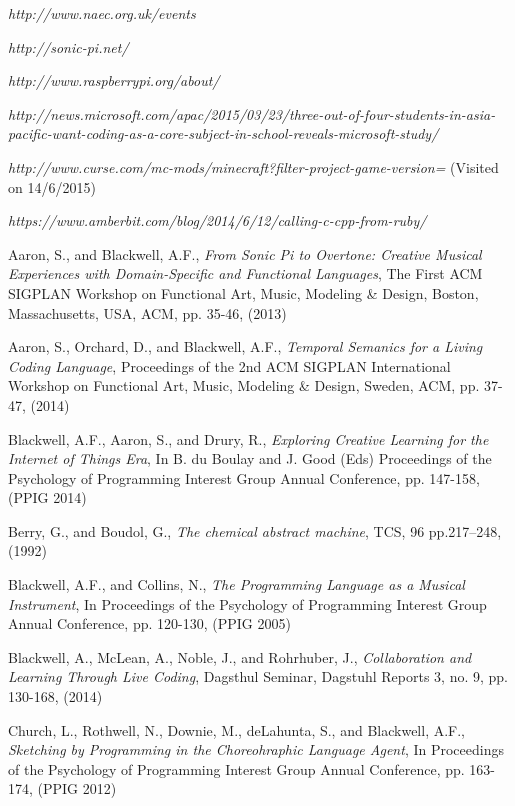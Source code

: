 \documentclass[11pt, abstracton, twoside, titlepage=true]{scrartcl}
\begin{document}
\begin{thebibliography}{9}
\thispagestyle{empty}

  \emph{http://www.naec.org.uk/events}

  \emph{http://sonic-pi.net/}

  \emph{http://www.raspberrypi.org/about/}

  \emph{http://news.microsoft.com/apac/2015/03/23/three-out-of-four-students-in-asia-pacific-want-coding-as-a-core-subject-in-school-reveals-microsoft-study/}

  \emph{http://www.curse.com/mc-mods/minecraft?filter-project-game-version=}
  (Visited on 14/6/2015)

  \emph{https://www.amberbit.com/blog/2014/6/12/calling-c-cpp-from-ruby/}

  Aaron, S., and Blackwell, A.F.,
  \emph{From Sonic Pi to Overtone: Creative Musical Experiences with Domain-Specific and Functional Languages},
  The First ACM SIGPLAN Workshop on Functional Art, Music, Modeling \& Design,
  Boston, Massachusetts, USA,
  ACM, pp. 35-46,
  (2013)

  Aaron, S., Orchard, D., and Blackwell, A.F.,
  \emph{Temporal Semanics for a Living Coding Language},
  Proceedings of the 2nd ACM SIGPLAN International Workshop on Functional Art, Music, Modeling \& Design,
  Sweden, ACM, pp. 37-47,
  (2014)

  Blackwell, A.F., Aaron, S., and Drury, R., 
  \emph{Exploring Creative Learning for the Internet of Things Era},
  In B. du Boulay and J. Good (Eds) Proceedings of the Psychology of Programming Interest Group Annual Conference, 
  pp. 147-158,
  (PPIG 2014)

  Berry, G., and Boudol, G.,
  \emph{The chemical abstract machine},
  TCS, 96 pp.217–248, 
  (1992)

  Blackwell, A.F., and Collins, N.,
  \emph{The Programming Language as a Musical Instrument},
  In Proceedings of the Psychology of Programming Interest Group Annual Conference,
  pp. 120-130,
  (PPIG 2005)

  Blackwell, A., McLean, A., Noble, J., and Rohrhuber, J.,
  \emph{Collaboration and Learning Through Live Coding},
  Dagsthul Seminar, Dagstuhl Reports 3,
  no. 9, pp. 130-168,
  (2014)

  Church, L., Rothwell, N., Downie, M., deLahunta, S., and Blackwell, A.F.,
  \emph{Sketching by Programming in the Choreohraphic Language Agent},
  In Proceedings of the Psychology of Programming Interest Group Annual Conference,
  pp. 163-174,
  (PPIG 2012)


\end{thebibliography}
\end{document}
